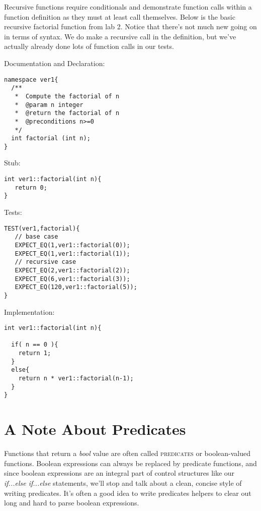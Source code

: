 \documentclass[]{tufte-handout}
\begin{document}
Recursive functions require conditionals and demonstrate function calls within a function definition as they must at least call themselves. Below is the basic recursive factorial function from lab 2. Notice that there's not much new going on in terms of syntax. We do make a recursive call in the definition, but we've actually already done lots of function calls in our tests. 

Documentation and Declaration:
\begin{verbatim}
namespace ver1{
  /**
   *  Compute the factorial of n
   *  @param n integer
   *  @return the factorial of n
   *  @preconditions n>=0
   */
  int factorial (int n);
}
\end{verbatim}

Stub:
\begin{verbatim}
int ver1::factorial(int n){
   return 0;
}	
\end{verbatim}

Tests:
\begin{verbatim}
TEST(ver1,factorial){
   // base case
   EXPECT_EQ(1,ver1::factorial(0));
   EXPECT_EQ(1,ver1::factorial(1));
   // recursive case
   EXPECT_EQ(2,ver1::factorial(2));
   EXPECT_EQ(6,ver1::factorial(3));
   EXPECT_EQ(120,ver1::factorial(5));
}
\end{verbatim}

Implementation:
\begin{verbatim}
int ver1::factorial(int n){

  if( n == 0 ){
    return 1;
  }
  else{
    return n * ver1::factorial(n-1);
  }
}

\end{verbatim}

\section{A Note About Predicates}

Functions that return a \textit{bool} value are often called \textsc{predicates} or boolean-valued functions. Boolean expressions can always be replaced by predicate functions, and since boolean expressions are an integral part of control structures like our \textit{if...else if...else} statements, we'll stop and talk about a clean, concise style of writing predicates.  It's often a good idea to write predicates helpers to clear out long and hard to parse boolean expressions. 
\end{document}
